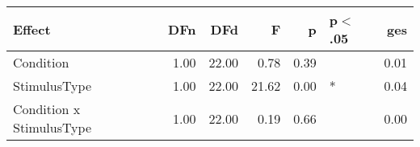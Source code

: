 \begin{table}[ht]
\centering
\begin{tabulary}{\textwidth}{lrrrrlr}
  \hline
Effect & DFn & DFd & F & p & p$<$.05 & ges \\ 
  \hline
Condition & 1.00 & 22.00 & 0.78 & 0.39 &  & 0.01 \\ 
  StimulusType & 1.00 & 22.00 & 21.62 & 0.00 & * & 0.04 \\ 
  Condition x StimulusType & 1.00 & 22.00 & 0.19 & 0.66 &  & 0.00 \\ 
   \hline
\end{tabulary}
\end{table}
